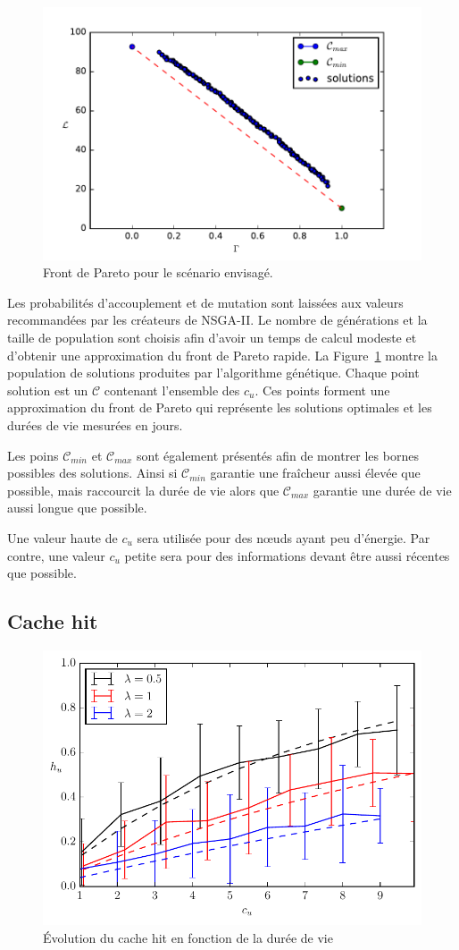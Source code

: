 \begin{figure}[ht]
  \centering

 \includegraphics[width=.7\textwidth]{img/pareto.pdf}

 \caption{Front de Pareto pour le scénario envisagé.}

 \label{cache:fig:paretofront}

\end{figure}

Les probabilités d'accouplement et de mutation sont laissées aux valeurs recommandées par les créateurs de NSGA-II.
Le nombre de générations et la taille de population sont choisis afin d'avoir un temps de calcul modeste et d'obtenir une approximation du front de Pareto rapide.
La Figure~\ref{cache:fig:paretofront} montre la population de solutions produites par l'algorithme génétique.
Chaque point solution est un $\mathcal{C}$ contenant l'ensemble des $c_u$.
Ces points forment une approximation du front de Pareto qui représente les solutions optimales et les durées de vie mesurées en jours.

Les poins $\mathcal{C}_{min}$ et $\mathcal{C}_{max}$ sont également présentés afin de montrer les bornes possibles des solutions.
Ainsi si  $\mathcal{C}_{min}$ garantie une fraîcheur aussi élevée que possible, mais raccourcit la durée de vie alors que $\mathcal{C}_{max}$ garantie une durée de vie aussi longue que possible.

Une valeur haute de $c_u$ sera utilisée pour des nœuds ayant peu d'énergie.
Par contre, une valeur $c_u$ petite sera pour des informations devant être aussi récentes que possible.

\subsection{Cache hit}

\begin{figure}[ht]
  \centering
  \includegraphics[width=.5\textwidth]{img/new_cachinghit.pdf}
  \caption{Évolution du cache hit en fonction de la durée de vie}
  \label{cache:fig:hit}
\end{figure}

